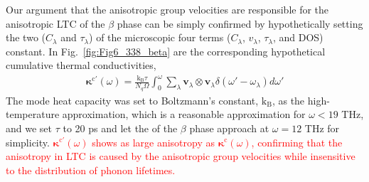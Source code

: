 \documentclass[twocolumn,amsmath,amssymb,a4paper,prb,superscriptaddress,floatfix]{revtex4-1}
\begin{document}
Our argument that the anisotropic group velocities are responsible for
the anisotropic LTC of the $\beta$ phase can be simply confirmed by
hypothetically setting the two ($C_\lambda$ and $\tau_\lambda$) of the
microscopic four terms ($C_\lambda$, $v_\lambda$, $\tau_\lambda$, and
DOS) constant. In Fig.~\ref{fig:Fig6_338_beta} are the corresponding
hypothetical cumulative thermal conductivities,
\begin{align}
 \boldsymbol{\kappa}^{\text{c}'}(\omega) =
 \frac{\mathrm{k_B}\tau}{N_q\Omega} \int^\omega_0 \sum_\lambda
 \mathbf{v}_\lambda
 \otimes \mathbf{v}_\lambda \delta(\omega' - \omega_\lambda)d\omega'
\end{align}
The mode heat capacity was set to Boltzmann’s constant, $\mathrm{k_B}$,
as the high-temperature approximation, which is a reasonable
approximation for $\omega < 19$ THz, and we set $\tau$ to 20 ps and let
the of the $\beta$ phase approach at $\omega=12$ THz for simplicity.
%
\textcolor{red}{$\boldsymbol{\kappa}^{\text{c}'}(\omega)$ shows as large
anisotropy as $\boldsymbol{\kappa}^{\text{c}}(\omega)$, confirming that the anisotropy in LTC is caused by the
anisotropic group velocities while insensitive to the distribution of
phonon lifetimes.}
\end{document}
